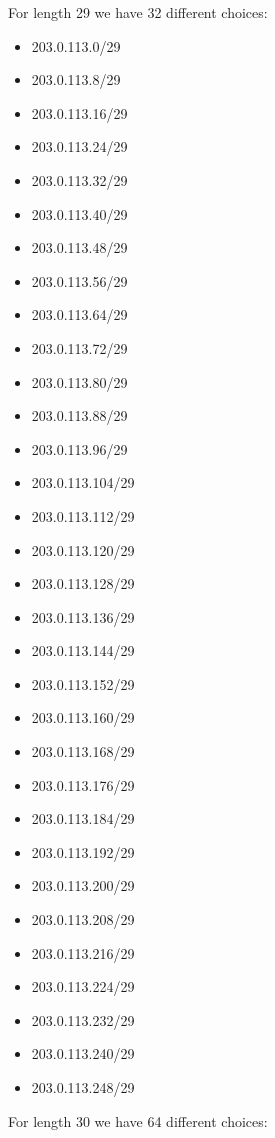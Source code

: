\documentclass[a4paper,10pt]{article}
\begin{document}
For length 29 we have 32 different choices:
\begin{itemize}
  \item 203.0.113.0/29
  \item 203.0.113.8/29
  \item 203.0.113.16/29
  \item 203.0.113.24/29
  \item 203.0.113.32/29
  \item 203.0.113.40/29
  \item 203.0.113.48/29
  \item 203.0.113.56/29
  \item 203.0.113.64/29
  \item 203.0.113.72/29
  \item 203.0.113.80/29
  \item 203.0.113.88/29
  \item 203.0.113.96/29
  \item 203.0.113.104/29
  \item 203.0.113.112/29
  \item 203.0.113.120/29
  \item 203.0.113.128/29
  \item 203.0.113.136/29
  \item 203.0.113.144/29
  \item 203.0.113.152/29
  \item 203.0.113.160/29
  \item 203.0.113.168/29
  \item 203.0.113.176/29
  \item 203.0.113.184/29
  \item 203.0.113.192/29
  \item 203.0.113.200/29
  \item 203.0.113.208/29
  \item 203.0.113.216/29
  \item 203.0.113.224/29
  \item 203.0.113.232/29
  \item 203.0.113.240/29
  \item 203.0.113.248/29
\end{itemize}
For length 30 we have 64 different choices:
\end{document}
